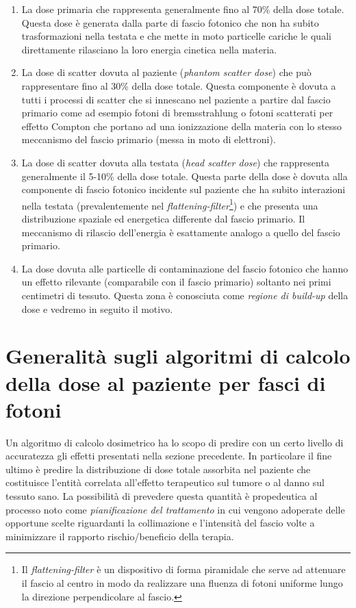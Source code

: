 \begin{enumerate}
\item La dose primaria che rappresenta generalmente fino al 70\% della dose totale. Questa dose è generata dalla parte di fascio fotonico che non ha subito trasformazioni nella testata e che mette in moto particelle cariche le quali direttamente rilasciano la loro energia cinetica nella materia.
\item La dose di scatter dovuta al paziente (\textit{phantom scatter dose}) che può rappresentare fino al 30\% della dose totale. Questa componente è dovuta a tutti i processi di scatter che si innescano nel paziente a partire dal fascio primario come ad esempio fotoni di bremsstrahlung o fotoni scatterati per effetto Compton che portano ad una ionizzazione della materia con lo stesso meccanismo del fascio primario (messa in moto di elettroni).
\item La dose di scatter dovuta alla testata (\textit{head scatter dose}) che rappresenta generalmente il 5-10\% della dose totale. Questa parte della dose è dovuta alla componente di fascio fotonico incidente sul paziente che ha subito interazioni nella testata (prevalentemente nel \textit{flattening-filter}\footnote{Il \textit{flattening-filter} è un dispositivo di forma piramidale che serve ad attenuare il fascio al centro in modo da realizzare una fluenza di fotoni uniforme lungo la direzione perpendicolare al fascio.}) e che presenta una distribuzione spaziale ed energetica differente dal fascio primario. Il meccanismo di rilascio dell'energia è esattamente analogo a quello del fascio primario.
\item La dose dovuta alle particelle di contaminazione del fascio fotonico che hanno un effetto rilevante (comparabile con il fascio primario) soltanto nei primi centimetri di tessuto. Questa zona è conosciuta come \textit{regione di build-up} della dose e vedremo in seguito il motivo.
\end{enumerate}


\section{Generalità sugli algoritmi di calcolo della dose al paziente per fasci di fotoni}
Un algoritmo di calcolo dosimetrico ha lo scopo di predire con un certo livello di accuratezza gli effetti presentati nella sezione precedente. In particolare il fine ultimo è predire la distribuzione di dose totale assorbita nel paziente che costituisce l'entità correlata all'effetto terapeutico sul tumore o al danno sul tessuto sano. La possibilità di prevedere questa quantità è propedeutica al processo noto come \textit{pianificazione del trattamento} in cui vengono adoperate delle opportune scelte riguardanti la collimazione e l'intensità del fascio volte a minimizzare il rapporto rischio/beneficio della terapia.


